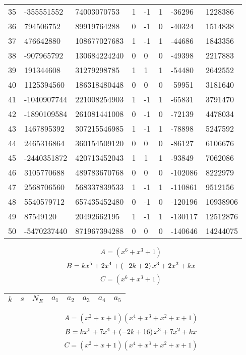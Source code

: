 \documentclass{amsart}
\begin{document}
\begin{longtable}{|l|l|l|lllll|}
35&-355551552&74003070753&1&-1&1&-36296&1228386\\
36&794506752&89919764288&0&-1&0&-40324&1514838\\
37&476642880&108677027683&1&-1&1&-44686&1843356\\
38&-907965792&130684224240&0&0&0&-49398&2217883\\
39&191344608&31279298785&1&1&1&-54480&2642552\\
40&1125394560&186318480448&0&0&0&-59951&3181640\\
41&-1040907744&221008254903&1&-1&1&-65831&3791470\\
42&-1890109584&261081441008&0&-1&0&-72139&4478034\\
43&1467895392&307215546985&1&-1&1&-78898&5247592\\
44&2465316864&360154509120&0&0&0&-86127&6106676\\
45&-2440351872&420713452043&1&1&1&-93849&7062086\\
46&3105770688&489783670768&0&0&0&-102086&8222979\\
47&2568706560&568337839533&1&-1&1&-110861&9512156\\
48&5540579712&657435452480&0&-1&0&-120196&10938906\\
49&87549120&20492662195&1&-1&1&-130117&12512876\\
50&-5470237440&871967394288&0&0&0&-140646&14244075\\
\hline
\end{longtable}
$$A=(x^6
 + x^3
 + 1)$$
$$B=k\*x^5
 + 2\*x^4
 + \left(-2\*k
 + 2\right) \*x^3
 + 2\*x^2
 + k\*x$$
$$C=(x^6
 + x^3
 + 1)$$
\begin{longtable}{|l|l|l|lllll|}
\hline
$k$ & $s$ & $N_E$ & $a_1$ & $a_2$ & $a_3$ & $a_4$ & $a_5$\\
\hline
\hline
\end{longtable}
$$A=(x^2
 + x
 + 1)(x^4
 + x^3
 + x^2
 + x
 + 1)$$
$$B=k\*x^5
 + 7\*x^4
 + \left(-2\*k
 + 16\right) \*x^3
 + 7\*x^2
 + k\*x$$
$$C=(x^2
 + x
 + 1)(x^4
 + x^3
 + x^2
 + x
 + 1)$$
\end{document}
